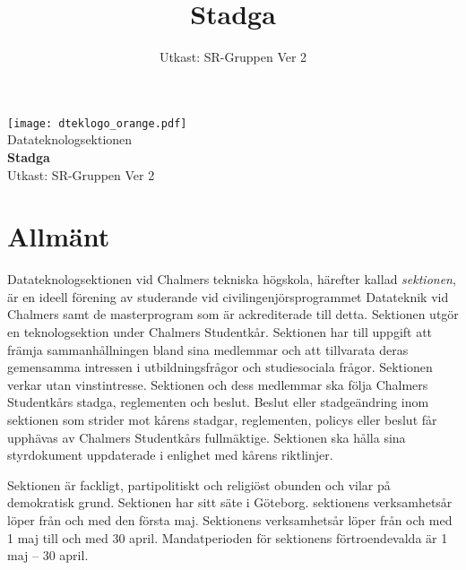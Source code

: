 \documentclass[a4paper]{dteklag}
\title{Stadga}
\date{Utkast: SR-Gruppen Ver 2}
\begin{document}
\begin{titlepage}
  \thispagestyle{empty} %
  \vspace*{1cm}
  \begin{center}
    \texttt{[image: dteklogo\_orange.pdf]}\\[3em]
    {\Huge Datateknologsektionen}\\[3em]
    {\Huge \textbf{Stadga}}\\[1em]
    Utkast: SR-Gruppen Ver 2
  \end{center}
\end{titlepage}

\makeheadfoot

\setcounter{tocdepth}{2}
\tableofcontents

\section{Allmänt}
\para[Ändamål] Datateknologsektionen vid Chalmers tekniska högskola, härefter kallad \textit{sektionen}, är en ideell förening av studerande vid civilingenjörsprogrammet Datateknik vid Chalmers samt de masterprogram som är ackrediterade till detta. Sektionen utgör en teknologsektion under Chalmers Studentkår. 
\para Sektionen har till uppgift att främja sammanhållningen bland sina medlemmar och att tillvarata deras gemensamma intressen i utbildningsfrågor och studiesociala frågor. Sektionen verkar utan vinstintresse.
\para Sektionen och dess medlemmar ska följa Chalmers Studentkårs stadga, reglementen och beslut. Beslut eller stadgeändring inom sektionen som strider mot kårens stadgar, reglementen, policys eller beslut får upphävas av Chalmers Studentkårs fullmäktige. Sektionen ska hålla sina styrdokument uppdaterade i enlighet med kårens riktlinjer. 

\para Sektionen är fackligt, partipolitiskt och religiöst obunden och vilar på demokratisk grund.
\para Sektionen har sitt säte i Göteborg.
\para[Verksamhetsår]
sektionens verksamhetsår löper från och med den första maj.
\para Sektionens verksamhetsår löper från och med 1 maj till och med 30 april. Mandatperioden för sektionens förtroendevalda är 1 maj – 30 april.

\end{document}
